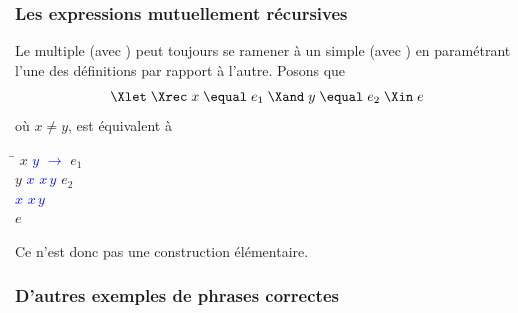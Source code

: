 %
%
\begin{frame}
\frametitle{Les expressions mutuellement récursives}
\label{expressions_mutuellement_recursives}

Le \Xlet{} \Xrec{} multiple (avec \Xand) peut toujours se ramener à un
\Xlet{} \Xrec{} simple (avec \Xin) en paramétrant l'une des
définitions par rapport à l'autre. Posons que
\begin{equation*}
\Xlet \; \Xrec \; x \; \equal \; e_1 \; \Xand \; y \; \equal \; e_2 \;
\Xin \; e
\end{equation*}
où $x \neq y$, est équivalent à
\begin{center}
\begin{minipage}{0.3\linewidth}
\begin{tabbing}
\Xlet{} \= \Xrec{} $x$ \equal{} \textcolor{blue}{\Xfun{} $y$
  $\rightarrow$} $e_1$ \Xin\\
\> \Xlet{} \Xrec{} $y$ \equal{} \textcolor{blue}{\Xlet{} $x$ \equal{} $x \, y$ \Xin} $e_2$ \Xin\\
\> \textcolor{blue}{\Xlet{} $x$ \equal{} $x \, y$}\\
\textcolor{blue}{\Xin} $e$
\end{tabbing}
\end{minipage}
\end{center}
Ce n'est donc pas une construction élémentaire.

\end{frame}

%
\begin{frame}
\frametitle{D'autres exemples de phrases correctes}






\end{frame}


